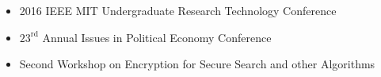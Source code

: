 
\begin{itemize}
	\item 2016 IEEE MIT Undergraduate Research Technology Conference
	\item $23^{\text{rd}}$ Annual Issues in Political Economy Conference
	\item Second Workshop on Encryption for Secure Search and other Algorithms
\end{itemize}

